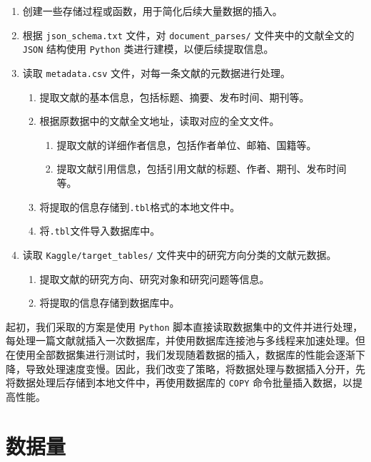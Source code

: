 \documentclass[UTF8,openany]{ctexbook}
\begin{document}
\begin{enumerate}
    \item 创建一些存储过程或函数，用于简化后续大量数据的插入。
    \item 根据 \texttt{json\_schema.txt} 文件，对 \texttt{document\_parses/} 文件夹中的文献全文的 \texttt{JSON} 结构使用 \texttt{Python} 类进行建模，以便后续提取信息。
    \item 读取 \texttt{metadata.csv} 文件，对每一条文献的元数据进行处理。
    \begin{enumerate}
        \item 提取文献的基本信息，包括标题、摘要、发布时间、期刊等。
        \item 根据原数据中的文献全文地址，读取对应的全文文件。
        
        \begin{enumerate}
            \item 提取文献的详细作者信息，包括作者单位、邮箱、国籍等。
            \item 提取文献引用信息，包括引用文献的标题、作者、期刊、发布时间等。
        \end{enumerate}

        \item 将提取的信息存储到\texttt{.tbl}格式的本地文件中。
        \item 将\texttt{.tbl}文件导入数据库中。
    \end{enumerate}
    \item 读取 \texttt{Kaggle/target\_tables/} 文件夹中的研究方向分类的文献元数据。
    
    \begin{enumerate}
        \item 提取文献的研究方向、研究对象和研究问题等信息。
        \item 将提取的信息存储到数据库中。
    \end{enumerate}
\end{enumerate}

起初，我们采取的方案是使用 \texttt{Python} 脚本直接读取数据集中的文件并进行处理，每处理一篇文献就插入一次数据库，并使用数据库连接池与多线程来加速处理。但在使用全部数据集进行测试时，我们发现随着数据的插入，数据库的性能会逐渐下降，导致处理速度变慢。因此，我们改变了策略，将数据处理与数据插入分开，先将数据处理后存储到本地文件中，再使用数据库的 \texttt{COPY} 命令批量插入数据，以提高性能。


\section{数据量}
\end{document}
